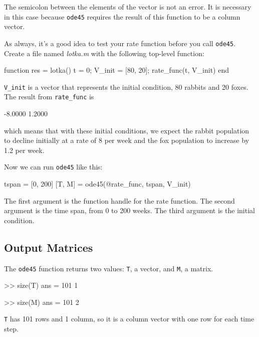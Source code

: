 The semicolon between the elements of the vector is not an error.  It
is necessary in this case because \lstinline{ode45} requires the result of
this function to be a column vector.


As always, it's a good idea to test your rate function before you call \lstinline{ode45}.
Create a file named \emph{lotka.m} with the following top-level function:

\begin{code}
function res = lotka()
    t = 0;
    V_init = [80, 20];
    rate_func(t, V_init)
end
\end{code}


\lstinline{V_init} is a vector that represents the initial condition, 80 rabbits and 20 foxes.
The result from \lstinline{rate_func} is

\begin{code}
-8.0000
 1.2000
 \end{code}
which means that with these initial conditions, we expect the rabbit population to decline initially at a rate of 8 per week and the fox population to increase by 1.2 per week.

Now we can run \lstinline{ode45} like this:

\begin{code}
tspan = [0, 200]
[T, M] = ode45(@rate_func, tspan, V_init)
\end{code}

The first argument is the function handle for the rate function.
The second argument is the time span, from 0 to 200 weeks.
The third argument is the initial condition.



\subsection{Output Matrices}

The \lstinline{ode45} function returns two values: \lstinline{T}, a vector,
and \lstinline{M}, a matrix.

\begin{code}
>> size(T)
ans = 101     1

>> size(M)
ans = 101     2
\end{code}

\lstinline{T} has 101 rows and 1 column, so it is a column vector with one row for
each time step.

